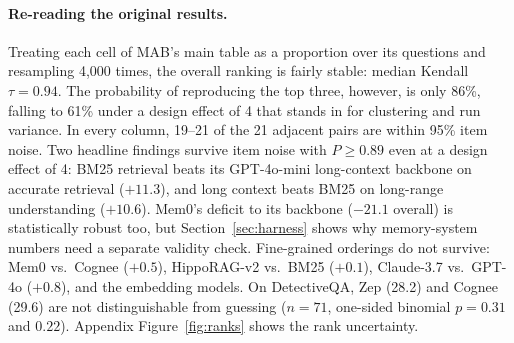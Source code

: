 \documentclass[11pt,a4paper]{article}
\begin{document}
\paragraph{Re-reading the original results.} Treating each cell of MAB's main table as a proportion over its
questions and resampling 4{,}000 times, the overall ranking is fairly stable: median Kendall $\tau=0.94$. The
probability of reproducing the top three, however, is only 86\%, falling to 61\% under a design effect of 4 that
stands in for clustering and run variance. In every column, 19--21 of the 21 adjacent pairs are within 95\% item
noise. Two headline findings survive item noise with $P\ge0.89$ even at a design effect of 4: BM25 retrieval beats its
GPT-4o-mini long-context backbone on accurate retrieval ($+11.3$), and long context beats BM25 on long-range
understanding ($+10.6$). Mem0's deficit to its backbone ($-21.1$ overall) is statistically robust too, but
Section~\ref{sec:harness} shows why memory-system numbers need a separate validity check. Fine-grained orderings do
not survive: Mem0 vs.\ Cognee ($+0.5$), HippoRAG-v2 vs.\ BM25 ($+0.1$), Claude-3.7 vs.\ GPT-4o ($+0.8$), and the
embedding models. On DetectiveQA, Zep (28.2) and Cognee (29.6) are not distinguishable from guessing ($n=71$,
one-sided binomial $p=0.31$ and $0.22$). Appendix Figure~\ref{fig:ranks} shows the rank uncertainty.
\end{document}
